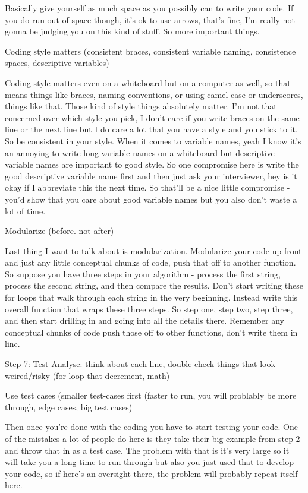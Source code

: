 Basically give yourself as much space as you possibly can to write your code. If you do run out of space though, it's ok to use arrows, that's fine, I'm really not gonna be judging you on this kind of stuff. So more important things.

Coding style matters (consistent braces, consistent variable naming, consistence spaces, descriptive variables)

Coding style matters even on a whiteboard but on a computer as well, so that means things like braces, naming conventions, or using camel case or underscores, things like that. Those kind of style things absolutely matter. I'm not that concerned over which style you pick, I don't care if you write braces on the same line or the next line but I do care a lot that you have a style and you stick to it. So be consistent in your style. When it comes to variable names, yeah I know it's an annoying to write long variable names on a whiteboard but descriptive variable names are important to good style. So one compromise here is write the good descriptive variable name first and then just ask your interviewer, hey is it okay if I abbreviate this the next time. So that'll be a nice little compromise - you'd show that you care about good variable names but you also don't waste a lot of time.

Modularize (before. not after)

Last thing I want to talk about is modularization. Modularize your code up front and just any little conceptual chunks of code, push that off to another function. So suppose you have three steps in your algorithm - process the first string, process the second string, and then compare the results. Don't start writing these for loops that walk through each string in the very beginning. Instead write this overall function that wraps these three steps. So step one, step two, step three, and then start drilling in and going into all the details there. Remember any conceptual chunks of code push those off to other functions, don't write them in line.

Step 7: Test
Analyse: think about each line, double check things that look weired/risky (for-loop that decrement, math)

Use test cases (smaller test-cases first (faster to run, you will problably be more through, edge cases, big test cases)

Then once you're done with the coding you have to start testing your code. One of the mistakes a lot of people do here is they take their big example from step 2 and throw that in as a test case. The problem with that is it's very large so it will take you a long time to run through but also you just used that to develop your code, so if here's an oversight there, the problem will probably repeat itself here.

